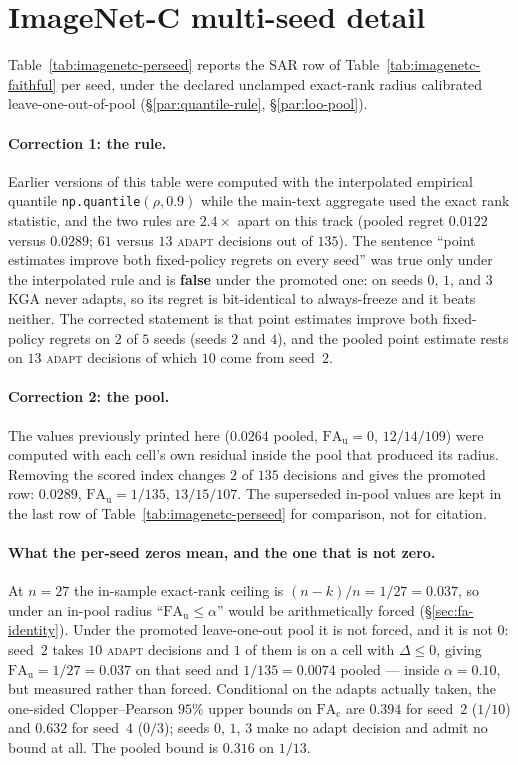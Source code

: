 \section{ImageNet-C multi-seed detail}\label{app:imagenetc-ms}
Table~\ref{tab:imagenetc-perseed} reports the SAR row of Table~\ref{tab:imagenetc-faithful} per
seed, under the declared unclamped exact-rank radius calibrated leave-one-out-of-pool
(\S\ref{par:quantile-rule}, \S\ref{par:loo-pool}).

\paragraph{Correction 1: the rule.} Earlier versions of this table were computed with the
interpolated empirical quantile \texttt{np.quantile}$(\rho,0.9)$ while the main-text aggregate used
the exact rank statistic, and the two rules are $2.4\times$ apart on this track (pooled regret
$0.0122$ versus $0.0289$; $61$ versus $13$ \textsc{adapt} decisions out of $135$). The sentence
``point estimates improve both fixed-policy regrets on every seed'' was true only under the
interpolated rule and is \textbf{false} under the promoted one: on seeds $0$, $1$, and $3$
\textsc{KGA} never adapts, so its regret is bit-identical to always-freeze and it beats neither. The
corrected statement is that point estimates improve both fixed-policy regrets on $2$ of $5$ seeds
(seeds $2$ and $4$), and the pooled point estimate rests on $13$ \textsc{adapt} decisions of which
$10$ come from seed~$2$.

\paragraph{Correction 2: the pool.} The values previously printed here ($0.0264$ pooled,
$\mathrm{FA}_{\mathrm u}=0$, $12/14/109$) were computed with each cell's own residual inside the
pool that produced its radius. Removing the scored index changes $2$ of $135$ decisions and gives
the promoted row: $0.0289$, $\mathrm{FA}_{\mathrm u}=1/135$, $13/15/107$. The superseded in-pool
values are kept in the last row of Table~\ref{tab:imagenetc-perseed} for comparison, not for
citation.

\paragraph{What the per-seed zeros mean, and the one that is not zero.} At $n=27$ the in-sample
exact-rank ceiling is $(n-k)/n=1/27=0.037$, so under an in-pool radius
``$\mathrm{FA}_{\mathrm u}\le\alpha$'' would be arithmetically forced
(\S\ref{sec:fa-identity}). Under the promoted leave-one-out pool it is not forced, and it is not
$0$: seed~$2$ takes $10$ \textsc{adapt} decisions and $1$ of them is on a cell with $\Delta\le0$,
giving $\mathrm{FA}_{\mathrm u}=1/27=0.037$ on that seed and $1/135=0.0074$ pooled --- inside
$\alpha=0.10$, but measured rather than forced. Conditional on the adapts actually taken, the
one-sided Clopper--Pearson $95\%$ upper bounds on $\mathrm{FA}_{\mathrm c}$ are $0.394$ for seed~$2$
($1/10$) and $0.632$ for seed~$4$ ($0/3$); seeds $0$, $1$, $3$ make no adapt decision and
admit no bound at all. The pooled bound is $0.316$ on $1/13$.

